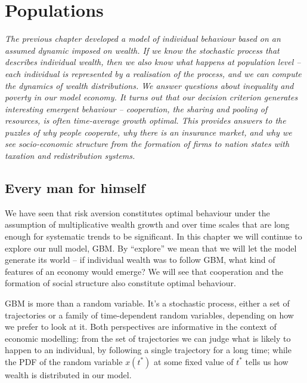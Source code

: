 \newpage


\section{Populations}
{\it 
The previous chapter developed a model of individual behaviour based on an
assumed dynamic imposed on wealth. If we know the stochastic process that describes
individual wealth, then we also know what happens at population level -- each individual
is represented by a realisation of the process, and we can compute 
the dynamics of wealth distributions. We answer questions about inequality and poverty in
our model economy. It turns out that our decision criterion generates interesting emergent
behaviour -- cooperation, the sharing and pooling of resources, is often time-average 
growth optimal. This provides answers to the puzzles of why people cooperate, why there 
is an insurance market, and why we see socio-economic structure from the formation of 
firms to nation states with taxation and redistribution systems.}
\newpage


\subsection{Every man for himself}

We have seen that risk aversion constitutes optimal behaviour under the assumption 
of multiplicative wealth growth and over time scales that are long enough for systematic 
trends to be significant. In this chapter we will continue to explore our null model, 
GBM. By ``explore'' we mean that we will let the model generate its world -- if 
individual wealth was to follow GBM, what kind of features of an economy would emerge? 
We will see that cooperation and the formation of social structure also constitute 
optimal behaviour.

GBM is more than a random variable. It's a stochastic process, either a set of trajectories 
or a family of time-dependent random variables, depending on how we 
prefer to look at it.  Both perspectives are informative in the context of economic modelling:
from the set of trajectories we can judge what is likely to happen to an individual, 
\eg by following a single trajectory for a long time; while the PDF of the random 
variable $x(t^*)$ at some fixed value of $t^*$ tells us how wealth is distributed in our model. 

